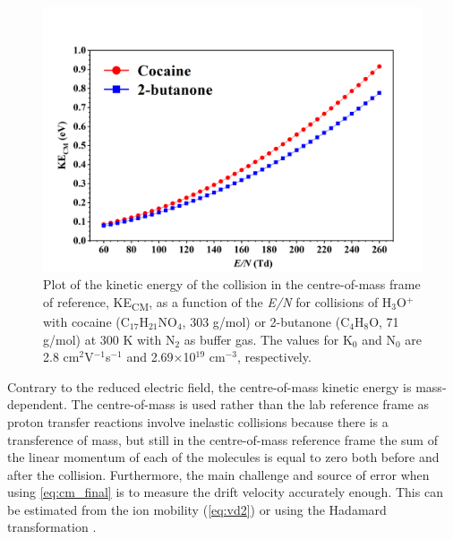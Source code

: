 \begin{figure}[t]
\centering
\includegraphics[width=0.7\linewidth]{pics/KE.png}
\centering
\caption{Plot of the kinetic energy of the collision
in the centre-of-mass frame of reference, KE\textsubscript{CM}, as a function of the \textit{E/N} for
collisions of H$_3$O$^+$ with cocaine (C$_{17}$H$_{21}$NO$_4$, 303 g/mol) or 2-butanone (C$_4$H$_8$O, 71 g/mol) at 300 K with N$_2$ as buffer gas. The values for K$_0$ and N$_0$ are  2.8 cm$^2$V$^{-1}$s$^{-1}$ and 2.69$\times$10$^{19}$ cm$^{-3}$, respectively.}
\label{fig:KE}
\end{figure}

















Contrary to the reduced electric field, the centre-of-mass kinetic energy is mass-dependent. %
The centre-of-mass is used rather than the lab reference frame as proton transfer reactions involve inelastic collisions because there is a transference of mass, but still in the centre-of-mass reference frame the sum of the linear momentum of each of the molecules is equal to zero both before and after the collision. %
%
%
Furthermore, the main challenge and source of error when using \autoref{eq:cm_final} is to measure the drift velocity accurately enough. This can be estimated from the ion mobility (\autoref{eq:vd2}) or using the Hadamard transformation \cite{doi:10.1002/rcm.7254}.







